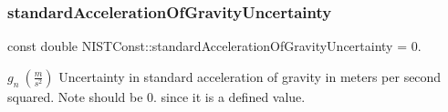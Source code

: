 \subsubsection{\texorpdfstring{standard\+Acceleration\+Of\+Gravity\+Uncertainty}{standardAccelerationOfGravityUncertainty}}
{\footnotesize\ttfamily const double N\+I\+S\+T\+Const\+::standard\+Acceleration\+Of\+Gravity\+Uncertainty = 0.}

$g_n \ (\frac{m}{s^2})$ Uncertainty in standard acceleration of gravity in meters per second squared. Note should be 0. since it is a defined value. 